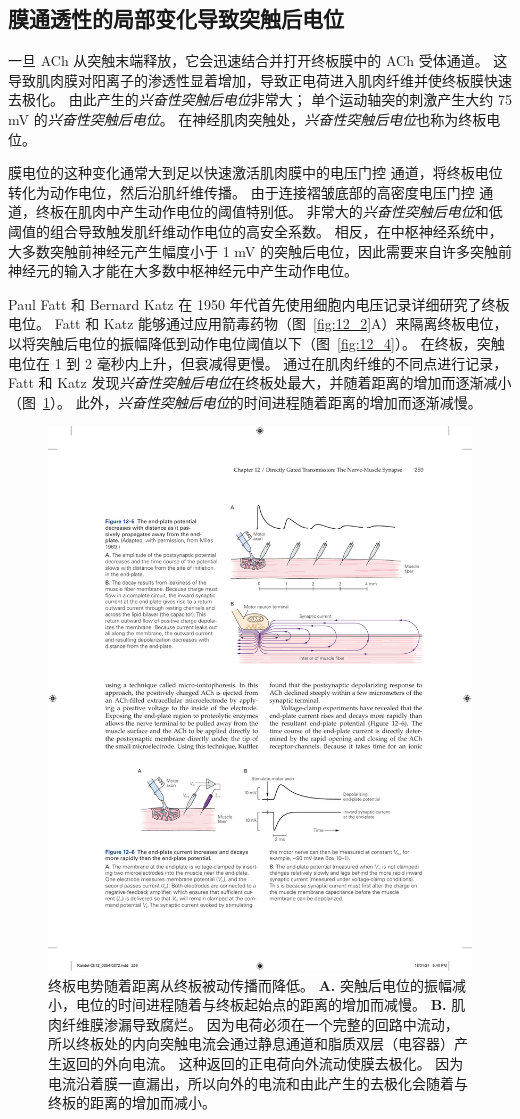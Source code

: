 \subsection{膜通透性的局部变化导致突触后电位}

一旦 ACh 从突触末端释放，它会迅速结合并打开终板膜中的 ACh 受体通道。
这导致肌肉膜对阳离子的渗透性显着增加，导致正电荷进入肌肉纤维并使终板膜快速去极化。
由此产生的\textit{兴奋性突触后电位}非常大；
单个运动轴突的刺激产生大约 75 mV 的\textit{兴奋性突触后电位}。
在神经肌肉突触处，\textit{兴奋性突触后电位}也称为终板电位。


膜电位的这种变化通常大到足以快速激活肌肉膜中的电压门控  通道，将终板电位转化为动作电位，然后沿肌纤维传播。
由于连接褶皱底部的高密度电压门控  通道，终板在肌肉中产生动作电位的阈值特别低。
非常大的\textit{兴奋性突触后电位}和低阈值的组合导致触发肌纤维动作电位的高安全系数。
相反，在中枢神经系统中，大多数突触前神经元产生幅度小于 1 mV 的突触后电位，因此需要来自许多突触前神经元的输入才能在大多数中枢神经元中产生动作电位。


Paul Fatt 和 Bernard Katz 在 1950 年代首先使用细胞内电压记录详细研究了终板电位。
Fatt 和 Katz 能够通过应用箭毒药物（图~\ref{fig:12_2}A）来隔离终板电位，以将突触后电位的振幅降低到动作电位阈值以下（图~\ref{fig:12_4}）。
在终板，突触电位在 1 到 2 毫秒内上升，但衰减得更慢。
通过在肌肉纤维的不同点进行记录，Fatt 和 Katz 发现\textit{兴奋性突触后电位}在终板处最大，并随着距离的增加而逐渐减小（图~\ref{fig:12_5}）。
此外，\textit{兴奋性突触后电位}的时间进程随着距离的增加而逐渐减慢。


\begin{figure}[htbp]
	\centering
	\includegraphics[width=0.6\linewidth]{chap12/fig_12_5}
	\caption{终板电势随着距离从终板被动传播而降低。
		\textbf{A.} 突触后电位的振幅减小，电位的时间进程随着与终板起始点的距离的增加而减慢。
		\textbf{B.} 肌肉纤维膜渗漏导致腐烂。
		因为电荷必须在一个完整的回路中流动，所以终板处的内向突触电流会通过静息通道和脂质双层（电容器）产生返回的外向电流。 
		这种返回的正电荷向外流动使膜去极化。 
		因为电流沿着膜一直漏出，所以向外的电流和由此产生的去极化会随着与终板的距离的增加而减小。}
	\label{fig:12_5}
\end{figure}


